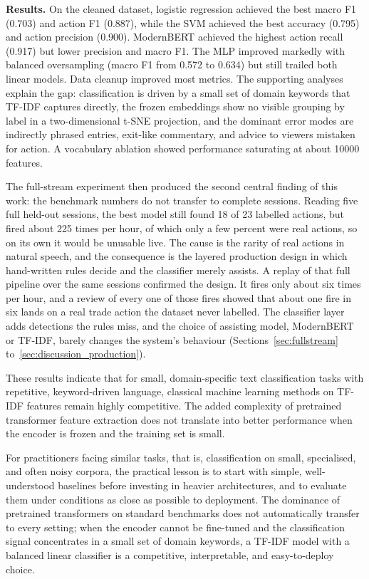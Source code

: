 \textbf{Results.} On the cleaned dataset, logistic regression achieved the best macro F1 (0.703) and action F1 (0.887), while the SVM achieved the best accuracy (0.795) and action precision (0.900). ModernBERT achieved the highest action recall (0.917) but lower precision and macro F1. The MLP improved markedly with balanced oversampling (macro F1 from 0.572 to 0.634) but still trailed both linear models. Data cleanup improved most metrics. The supporting analyses explain the gap: classification is driven by a small set of domain keywords that TF-IDF captures directly, the frozen embeddings show no visible grouping by label in a two-dimensional t-SNE projection, and the dominant error modes are indirectly phrased entries, exit-like commentary, and advice to viewers mistaken for action. A vocabulary ablation showed performance saturating at about 10000 features.

The full-stream experiment then produced the second central finding of this work: the benchmark numbers do not transfer to complete sessions. Reading five full held-out sessions, the best model still found 18 of 23 labelled actions, but fired about 225 times per hour, of which only a few percent were real actions, so on its own it would be unusable live. The cause is the rarity of real actions in natural speech, and the consequence is the layered production design in which hand-written rules decide and the classifier merely assists. A replay of that full pipeline over the same sessions confirmed the design. It fires only about six times per hour, and a review of every one of those fires showed that about one fire in six lands on a real trade action the dataset never labelled. The classifier layer adds detections the rules miss, and the choice of assisting model, ModernBERT or TF-IDF, barely changes the system's behaviour (Sections~\ref{sec:fullstream} to~\ref{sec:discussion_production}).

These results indicate that for small, domain-specific text classification tasks with repetitive, keyword-driven language, classical machine learning methods on TF-IDF features remain highly competitive. The added complexity of pretrained transformer feature extraction does not translate into better performance when the encoder is frozen and the training set is small.

For practitioners facing similar tasks, that is, classification on small, specialised, and often noisy corpora, the practical lesson is to start with simple, well-understood baselines before investing in heavier architectures, and to evaluate them under conditions as close as possible to deployment. The dominance of pretrained transformers on standard benchmarks does not automatically transfer to every setting; when the encoder cannot be fine-tuned and the classification signal concentrates in a small set of domain keywords, a TF-IDF model with a balanced linear classifier is a competitive, interpretable, and easy-to-deploy choice.

